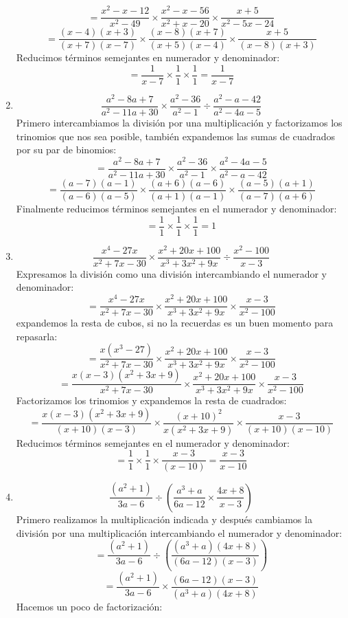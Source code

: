 \documentclass[12pt]{article}
\begin{document}
\begin{enumerate}[label=\bfseries Ejercicio \arabic*:]
$$= \frac{x^2 - x - 12}{x^2 - 49} \times \frac{x^2 - x - 56}{x^2 + x - 20} \times \frac{x + 5}{x^2 - 5x - 24}$$
$$= \frac{(x - 4)(x + 3)}{(x + 7)(x - 7)} \times \frac{(x - 8)(x + 7)}{(x + 5)(x - 4)} \times \frac{x+5}{(x - 8)(x + 3)}$$
Reducimos términos semejantes en numerador y denominador:
$$= \frac{1}{x - 7} \times \frac{1}{1} \times \frac{1}{1} = \frac{1}{x - 7} $$
  \item $$\frac{a^2 - 8a + 7}{a^2 - 11a + 30} \times \frac{a^2 - 36}{a^2 - 1} \div \frac{a^2 - a -42}{a^2 - 4a - 5}$$
Primero intercambiamos la división por una multiplicación y factorizamos los trinomios que nos sea posible, también expandemos las sumas de cuadrados por su par de binomios:
$$= \frac{a^2 - 8a + 7}{a^2 - 11a + 30} \times \frac{a^2 - 36}{a^2 - 1} \times \frac{a^2 - 4a - 5}{a^2 - a -42}$$
$$= \frac{(a - 7)(a - 1)}{(a - 6)(a - 5)} \times \frac{(a + 6)(a - 6)}{(a + 1)(a - 1)} \times \frac{(a - 5)(a + 1)}{(a - 7)(a + 6)}$$
Finalmente reducimos términos semejantes en el numerador y denominador:
$$= \frac{1}{1} \times \frac{1}{1} \times \frac{1}{1} = 1$$
  \item $$\frac{x^4 - 27x}{x^2 + 7x - 30} \times \frac{x^2 + 20x + 100}{x^3 + 3x^2 + 9x} \div \frac{x^2 - 100}{x - 3}$$
Expresamos la división como una división intercambiando el numerador y denominador:
$$= \frac{x^4 - 27x}{x^2 + 7x - 30} \times \frac{x^2 + 20x + 100}{x^3 + 3x^2 + 9x} \times \frac{x - 3}{x^2 - 100}$$
expandemos la resta de cubos, si no la recuerdas es un buen momento para repasarla:
$$= \frac{x(x^3 - 27)}{x^2 + 7x - 30} \times \frac{x^2 + 20x + 100}{x^3 + 3x^2 + 9x} \times \frac{x - 3}{x^2 - 100}$$
$$= \frac{x(x - 3)(x^2 + 3x + 9)}{x^2 + 7x - 30} \times \frac{x^2 + 20x + 100}{x^3 + 3x^2 + 9x} \times \frac{x - 3}{x^2 - 100}$$
Factorizamos los trinomios y expandemos la resta de cuadrados:
$$= \frac{x(x - 3)(x^2 + 3x + 9)}{(x + 10)(x - 3)} \times \frac{(x + 10)^2}{x(x^2 + 3x + 9)} \times \frac{x - 3}{(x + 10)(x - 10)}$$
Reducimos términos semejantes en el numerador y denominador:
$$= \frac{1}{1} \times \frac{1}{1} \times \frac{x - 3}{(x - 10)} = \frac{x - 3}{x - 10}$$
  \item $$\frac{(a^2 + 1)}{3a -6} \div \left( \frac{a^3 +a}{6a - 12} \times \frac{4x + 8}{x - 3} \right)$$
Primero realizamos la multiplicación indicada y después cambiamos la división por una multiplicación intercambiando el numerador y denominador:
$$= \frac{(a^2 + 1)}{3a -6} \div \left( \frac{(a^3 +a)(4x + 8)}{(6a - 12)(x - 3)} \right)$$
$$= \frac{(a^2 + 1)}{3a -6} \times \frac{(6a - 12)(x - 3)}{(a^3 +a)(4x + 8)}$$
Hacemos un poco de factorización:

\end{enumerate}
\end{document}
